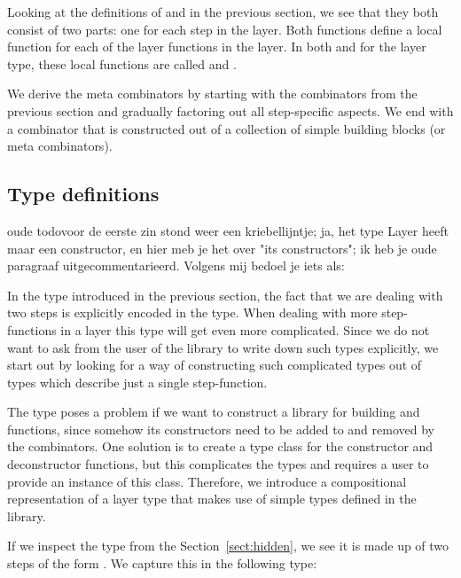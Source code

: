 \documentclass[preprint,natbib]{sigplanconf}
\begin{document}
Looking at the definitions of  and  in the previous section, we see that they both consist of two parts: one for each step in the layer. Both functions define a local function for each of the layer functions in the layer. In both  and  for the  layer type, these local functions are called  and . 

We derive the meta combinators by starting with the combinators from the previous section and gradually factoring out all step-specific aspects. We end with a combinator that is constructed out of a collection of simple building blocks (or meta combinators). 



 
%																
\subsection{Type definitions} \label{subsecttypedef}

\bc
oude todo{voor de eerste zin stond weer een kriebellijntje; ja, het type Layer heeft maar een constructor, en hier meb je het over "its constructors"; ik heb je oude paragraaf uitgecommentarieerd. Volgens mij bedoel je iets als:}



In the  type introduced in the previous section, the fact that we are dealing with two steps is explicitly encoded in the type. When dealing with more step-functions in a layer this type will get even more complicated. Since we do not want to ask from the user of the library to write  down such types explicitly, we start out by looking for a way of constructing such complicated types out of types which describe just a single step-function.
\ec


The  type poses a problem if we want to construct a library for building  and  functions, since somehow its constructors need to be added to and removed by the combinators. One solution is to create a type class for the constructor and deconstructor functions, but this complicates the types and requires a user to provide an instance of this class. Therefore, we introduce a compositional representation of a layer type that makes use of simple types defined in the library.

If we inspect the  type from the Section~\ref{sect:hidden}, we see it is made up of two steps of the form . We  capture this in the following type:
\end{document}
